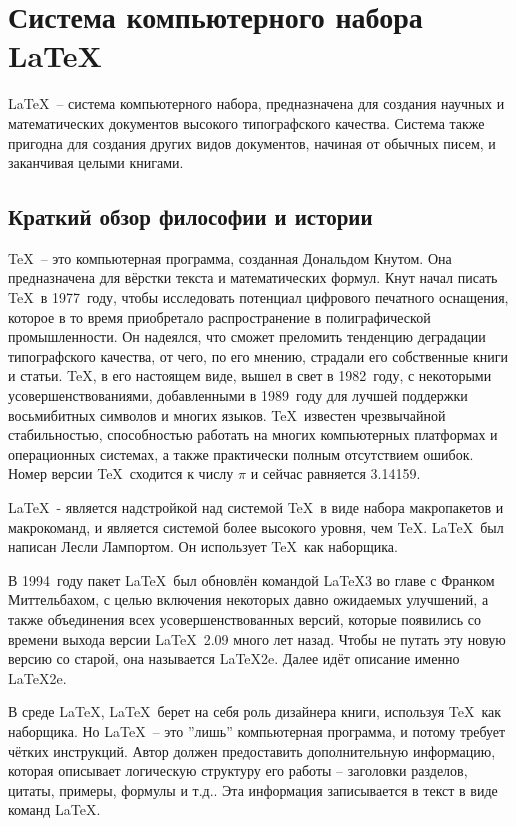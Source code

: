 \section{Система компьютерного набора \LaTeX}

\LaTeX\ – система компьютерного набора, предназначена для создания научных и математических документов высокого типографского качества. Система также пригодна для создания других видов документов, начиная от обычных писем, и заканчивая целыми книгами.

\subsection{Краткий обзор философии и истории}

\TeX\ – это компьютерная программа, созданная Дональдом Кнутом. Она предназначена для вёрстки текста и математических формул. Кнут начал писать \TeX\ в 1977~году, чтобы исследовать потенциал цифрового печатного оснащения, которое в то время приобретало распространение в полиграфической промышленности. Он надеялся, что сможет преломить тенденцию деградации типографского качества, от чего, по его мнению, страдали его собственные книги и статьи. \TeX, в его настоящем виде, вышел в свет в 1982~году, с некоторыми усовершенствованиями, добавленными в 1989~году для лучшей поддержки восьмибитных символов и многих языков. \TeX\ известен чрезвычайной стабильностью, способностью работать на многих компьютерных платформах и операционных системах, а также практически полным отсутствием ошибок. Номер версии \TeX\ сходится к числу $\pi$ и сейчас равняется 3.14159.

\LaTeX\ - является надстройкой над системой \TeX\ в виде набора макропакетов и макрокоманд, и является системой более высокого уровня, чем \TeX. \LaTeX\ был написан Лесли Лампортом. Он использует \TeX\ как наборщика.

В 1994~году пакет \LaTeX\ был обновлён командой \LaTeX3 во главе с Франком   Миттельбахом, с целью включения некоторых давно ожидаемых улучшений, а также объединения всех усовершенствованных версий, которые появились со времени выхода версии \LaTeX~2.09 много лет назад. Чтобы не путать эту новую версию со старой, она называется \LaTeX2e. Далее идёт описание именно \LaTeX2e.

В среде \LaTeX, \LaTeX\ берет на себя роль дизайнера книги, используя \TeX\ как наборщика. Но \LaTeX\ – это ''лишь'' компьютерная программа, и потому требует чётких инструкций. Автор должен предоставить дополнительную информацию, которая описывает логическую структуру его работы – заголовки разделов, цитаты, примеры, формулы и т.д.. Эта информация записывается в текст в виде команд \LaTeX.

